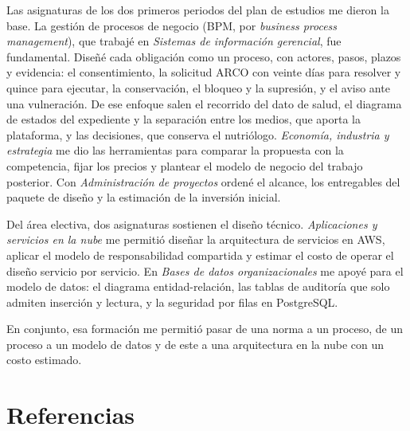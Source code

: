 \documentclass[12pt, a4paper]{article}
\makeatletter
\newcommand{\saltoseccion}{\par
  \ifx\@deferlist\@empty
    \ifdim\pagegoal<\maxdimen
      \ifdim\dimexpr\textheight-\pagegoal+\pagetotal\relax>0.5\textheight\clearpage\fi
    \fi
  \else\clearpage\fi}
\let\seccionbase\section
\renewcommand{\section}{\saltoseccion\seccionbase}
\makeatother
\begin{document}
Las asignaturas de los dos primeros periodos del plan de estudios me
dieron la base. La gestión de procesos de negocio (BPM, por
\textit{business process management}), que trabajé en \textit{Sistemas
de información gerencial}, fue fundamental. Diseñé cada obligación como
un proceso, con actores, pasos, plazos y evidencia: el consentimiento,
la solicitud ARCO con veinte días para resolver y quince para ejecutar,
la conservación, el bloqueo y la supresión, y el aviso ante una
vulneración. De ese enfoque salen el recorrido del dato de salud, el
diagrama de estados del expediente y la separación entre los medios, que
aporta la plataforma, y las decisiones, que conserva el nutriólogo.
\textit{Economía, industria y estrategia} me dio las herramientas para
comparar la propuesta con la competencia, fijar los precios y plantear
el modelo de negocio del trabajo posterior. Con \textit{Administración
de proyectos} ordené el alcance, los entregables del paquete de diseño y
la estimación de la inversión inicial.

Del área electiva, dos asignaturas sostienen el diseño técnico.
\textit{Aplicaciones y servicios en la nube} me permitió diseñar la
arquitectura de servicios en AWS, aplicar el modelo de responsabilidad
compartida y estimar el costo de operar el diseño servicio por servicio.
En \textit{Bases de datos organizacionales} me apoyé para el modelo de
datos: el diagrama entidad-relación, las tablas de auditoría que solo
admiten inserción y lectura, y la seguridad por filas en PostgreSQL.

En conjunto, esa formación me permitió pasar de una norma a un proceso,
de un proceso a un modelo de datos y de este a una arquitectura en la
nube con un costo estimado.

%

\section*{Referencias}
\end{document}
